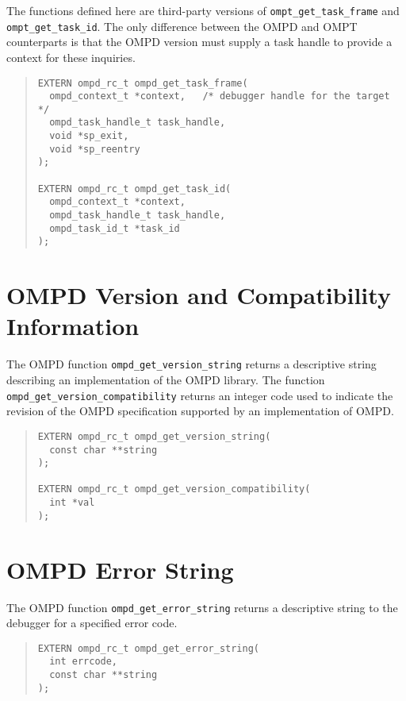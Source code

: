 \documentclass{article}
\begin{document}
The functions defined here are third-party versions of \verb|ompt_get_task_frame| and \verb|ompt_get_task_id|. 
The only difference between the OMPD and OMPT counterparts is that the OMPD version must supply a task  handle to provide a context for these inquiries.

\begin{quote}
\begin{verbatim}
EXTERN ompd_rc_t ompd_get_task_frame(
  ompd_context_t *context,   /* debugger handle for the target */
  ompd_task_handle_t task_handle,
  void *sp_exit, 
  void *sp_reentry
);

EXTERN ompd_rc_t ompd_get_task_id(
  ompd_context_t *context,
  ompd_task_handle_t task_handle, 
  ompd_task_id_t *task_id
);
\end{verbatim}
\end{quote}

\section{OMPD Version and Compatibility Information}

The OMPD function \verb|ompd_get_version_string| returns a descriptive string describing an implementation of the OMPD library. The function \verb|ompd_get_version_compatibility| returns an integer code used to indicate the revision of the OMPD specification supported by an implementation of OMPD.

\begin{quote}
\begin{verbatim}
EXTERN ompd_rc_t ompd_get_version_string(
  const char **string
);

EXTERN ompd_rc_t ompd_get_version_compatibility(
  int *val
);
\end{verbatim}
\end{quote}

\section{OMPD Error String}

The OMPD function \verb|ompd_get_error_string| returns a descriptive string to the debugger for a specified error code.

\begin{quote}
\begin{verbatim}
EXTERN ompd_rc_t ompd_get_error_string(
  int errcode,
  const char **string
);

\end{verbatim}
\end{quote}
\end{document}
